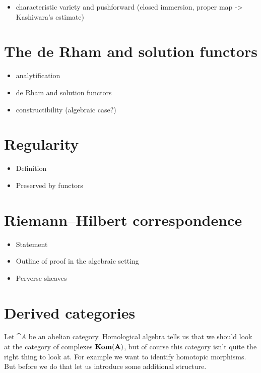 \documentclass[number-in-sections,a4paper]{notes}
\begin{document}
\begin{itemize}
    \item characteristic variety and pushforward (closed immersion, proper map -> Kashiwara's estimate)
\end{itemize}


\section{The de Rham and solution functors}

\begin{itemize}
    \item analytification
    \item de Rham and solution functors
    \item constructibility (algebraic case?)
\end{itemize}

\section{Regularity}

\begin{itemize}
    \item Definition
    \item Preserved by functors
\end{itemize}

\section{Riemann--Hilbert correspondence}

\begin{itemize}
    \item Statement
    \item Outline of proof in the algebraic setting
    \item Perverse sheaves
\end{itemize}

\fi
\appendix

\section{Derived categories}
Let $\cat A$ be an abelian category.
Homological algebra tells us that we should look at the category of complexes $\mathbf{Kom}(\mathbf A)$, but of course this category isn't quite the right thing to look at.
For example we want to identify homotopic morphisms.
But before we do that let us introduce some additional structure.
\end{document}
